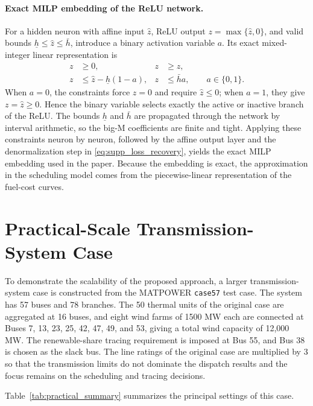 \documentclass[letterpaper,journal]{IEEEtran}
\begin{document}
\paragraph{Exact MILP embedding of the ReLU network.}
For a hidden neuron with affine input $\hat z$, ReLU output $z=\max\{\hat z,0\}$, and valid
bounds $\underline h\leq\hat z\leq\bar h$, introduce a binary activation variable $a$. Its
exact mixed-integer linear representation is
\begin{subequations}
\label{eq:supp_relu_milp}
\begin{align}
z&\geq 0, & z&\geq \hat z,\label{eq:supp_relu_lower}\\
z&\leq \hat z-\underline h(1-a), &
z&\leq \bar h a,\qquad a\in\{0,1\}.\label{eq:supp_relu_upper}
\end{align}
\end{subequations}
When $a=0$, the constraints force $z=0$ and require $\hat z\leq0$; when $a=1$, they give
$z=\hat z\geq0$. Hence the binary variable selects exactly the active or inactive branch of
the ReLU. The bounds $\underline h$ and $\bar h$ are propagated through the network by
interval arithmetic, so the big-M coefficients are finite and tight. Applying these
constraints neuron by neuron, followed by the affine output layer and the denormalization
step in \eqref{eq:supp_loss_recovery}, yields the exact MILP embedding used in the paper.
Because the embedding is exact, the approximation in the scheduling model comes from the
piecewise-linear representation of the fuel-cost curves.

\section{Practical-Scale Transmission-System Case}

To demonstrate the scalability of the proposed approach, a larger transmission-system case
is constructed from the MATPOWER \texttt{case57} test case. The system has 57 buses and 78
branches. The 50 thermal units of the original case are aggregated at 16 buses, and eight
wind farms of 1500 MW each are connected at Buses 7, 13, 23, 25, 42, 47, 49, and 53, giving
a total wind capacity of 12,000 MW. The renewable-share tracing requirement is imposed at
Bus 55, and Bus 38 is chosen as the slack bus. The line ratings of the original case are
multiplied by 3 so that the transmission limits do not dominate the dispatch results and the
focus remains on the scheduling and tracing decisions.

Table~\ref{tab:practical_summary} summarizes the principal settings of this case.
\end{document}
